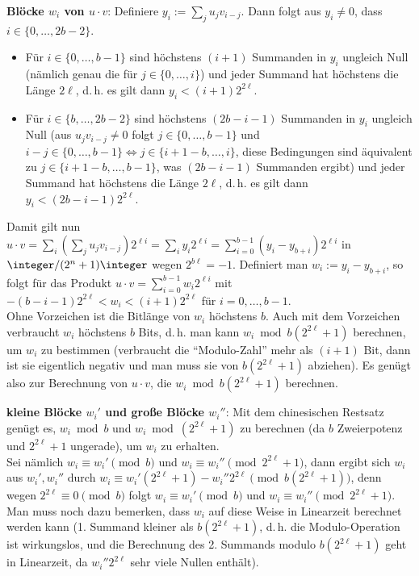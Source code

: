 \linie

\textbf{Blöcke $w_i$ von $u \cdot v$}:
Definiere $y_i := \sum_j u_j v_{i-j}$.
Dann folgt aus $y_i \not= 0$, dass $i \in \{0, \dotsc, 2b - 2\}$.
\begin{itemize}
    \item
    Für $i \in \{0, \dotsc, b - 1\}$ sind höchstens $(i + 1)$ Summanden in $y_i$ ungleich Null
    (nämlich genau die für $j \in \{0, \dotsc, i\}$)
    und jeder Summand hat höchstens die Länge $2\ell$,
    d.\,h. es gilt dann $y_i < (i + 1) 2^{2\ell}$.
    
    \item
    Für $i \in \{b, \dotsc, 2b - 2\}$ sind höchstens $(2b-i-1)$ Summanden in $y_i$ ungleich Null
    (aus $u_j v_{i-j} \not= 0$ folgt $j \in \{0, \dotsc, b - 1\}$ und
    $i - j \in \{0, \dotsc, b - 1\} \iff j \in \{i+1-b, \dotsc, i\}$,
    diese Bedingungen sind äquivalent zu $j \in \{i+1-b, \dotsc, b-1\}$,
    was $(2b-i-1)$ Summanden ergibt)
    und jeder Summand hat höchstens die Länge $2\ell$,
    d.\,h. es gilt dann $y_i < (2b-i-1) 2^{2\ell}$.
\end{itemize}
Damit gilt nun $u \cdot v = \sum_i (\sum_j u_j v_{i-j}) 2^{\ell i} = \sum_i y_i 2^{\ell i} =
\sum_{i=0}^{b-1} (y_i - y_{b+i}) 2^{\ell i}$ in $\integer/(2^n + 1)\integer$ wegen
$2^{b\ell} = -1$.
Definiert man $w_i := y_i - y_{b+i}$, so folgt für das Produkt
$u \cdot v = \sum_{i=0}^{b-1} w_i 2^{\ell i}$
mit $-(b-i-1)2^{2\ell} < w_i < (i+1)2^{2\ell}$ für $i = 0, \dotsc, b - 1$.\\
Ohne Vorzeichen ist die Bitlänge von $w_i$ höchstens $b$.
Auch mit dem Vorzeichen verbraucht $w_i$ höchstens $b$ Bits, d.\,h. man kann
$w_i \bmod b(2^{2\ell} + 1)$ berechnen, um $w_i$ zu bestimmen
(verbraucht die "`Modulo-Zahl"' mehr als $(i + 1)$ Bit, dann ist sie eigentlich negativ und
man muss sie von $b(2^{2\ell} + 1)$ abziehen).
Es genügt also zur Berechnung von $u \cdot v$, die $w_i \bmod b(2^{2\ell} + 1)$ berechnen.

\linie

\textbf{kleine Blöcke $w_i'$ und große Blöcke $w_i''$}:
Mit dem chinesischen Restsatz genügt es, $w_i \bmod b$ und $w_i \bmod (2^{2\ell} + 1)$ zu berechnen
(da $b$ Zweierpotenz und $2^{2\ell}+1$ ungerade), um $w_i$ zu erhalten.\\
Sei nämlich $w_i \equiv w_i' \pmod b$ und $w_i \equiv w_i'' \pmod{2^{2\ell} + 1}$,
dann ergibt sich $w_i$ aus $w_i', w_i''$ durch
$w_i \equiv w_i' (2^{2\ell}+1) - w_i'' 2^{2\ell} \pmod{b(2^{2\ell}+1)}$,
denn wegen $2^{2\ell} \equiv 0 \pmod b$ folgt $w_i \equiv w_i' \pmod b$ und
$w_i \equiv w_i'' \pmod{2^{2\ell} + 1}$.\\
Man muss noch dazu bemerken, dass $w_i$ auf diese Weise in Linearzeit berechnet werden kann
(1. Summand kleiner als $b(2^{2\ell}+1)$, d.\,h. die Modulo-Operation ist wirkungslos,
und die Berechnung des 2. Summands modulo $b(2^{2\ell}+1)$ geht in Linearzeit,
da $w_i'' 2^{2\ell}$ sehr viele Nullen enthält).

